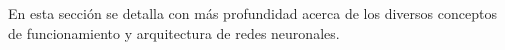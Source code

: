 En esta sección se detalla con más profundidad  acerca de los diversos conceptos de funcionamiento y arquitectura de redes neuronales.
